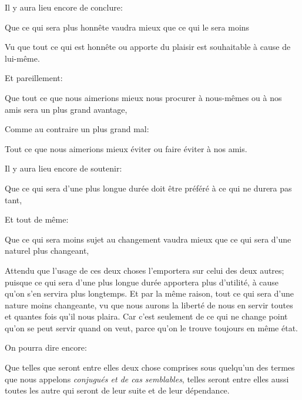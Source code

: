 Il y aura lieu encore de conclure:

\begin{lieu}
	Que ce qui sera plus honnête vaudra mieux que ce qui le sera moins
\end{lieu}

Vu que tout ce qui est honnête ou apporte du plaisir est souhaitable à cause de lui-même.

\bigbreak

Et pareillement:

\begin{lieu}
	Que tout ce que nous aimerions mieux nous procurer à nous-mêmes ou à nos amis sera un plus grand avantage,
\end{lieu}

Comme au contraire un plus grand mal:

\begin{lieu}
	Tout ce que nous aimerions mieux éviter ou faire éviter à nos amis.
\end{lieu}

\bigbreak

Il y aura lieu encore de soutenir:

\begin{lieu}
	Que ce qui sera d'une plus longue durée doit être préféré à ce qui ne durera pas tant,
\end{lieu}

Et tout de même:

\begin{lieu}
	Que ce qui sera moins sujet au changement vaudra mieux que ce qui sera d'une naturel plus changeant,
\end{lieu}

Attendu que l'usage de ces deux choses l'emportera sur celui des deux autres; puisque ce qui sera d'une plus
longue durée apportera plus d'utilité, à cause qu'on s'en servira plus longtemps. Et par la même raison, tout
ce qui sera d'une nature moins changeante, vu que nous aurons la liberté de nous en servir toutes et quantes
fois qu'il nous plaira. Car c'est seulement de ce qui ne change point qu'on se peut servir quand on veut, parce
qu'on le trouve toujours en même état.

\bigbreak

On pourra dire encore:

\begin{lieu}
	Que telles que seront entre elles deux chose comprises sous quelqu'un des termes que nous appelons \emph{
	conjugués et de cas semblables}, telles seront entre elles aussi toutes les autre qui seront de leur suite
	et de leur dépendance.
\end{lieu}

